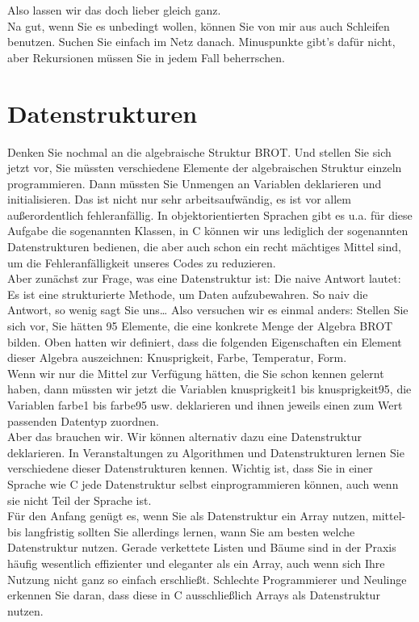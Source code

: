 Also lassen wir das doch lieber gleich ganz.\\

Na gut, wenn Sie es unbedingt wollen, können Sie von mir aus auch Schleifen benutzen. Suchen Sie einfach im Netz danach. Minuspunkte gibt’s dafür nicht, aber Rekursionen müssen Sie in jedem Fall beherrschen.

\section{Datenstrukturen}

Denken Sie nochmal an die algebraische Struktur BROT. Und stellen Sie sich jetzt vor, Sie müssten verschiedene Elemente der algebraischen Struktur einzeln programmieren. Dann müssten Sie Unmengen an Variablen deklarieren und initialisieren. Das ist nicht nur sehr arbeitsaufwändig, es ist vor allem außerordentlich fehleranfällig. In objektorientierten Sprachen gibt es u.a. für diese Aufgabe die sogenannten Klassen, in C können wir uns lediglich der sogenannten Datenstrukturen bedienen, die aber auch schon ein recht mächtiges Mittel sind, um die Fehleranfälligkeit unseres Codes zu reduzieren.\\

Aber zunächst zur Frage, was eine Datenstruktur ist: Die naive Antwort lautet: Es ist eine strukturierte Methode, um Daten aufzubewahren. So naiv die Antwort, so wenig sagt Sie uns… Also versuchen wir es einmal anders: Stellen Sie sich vor, Sie hätten 95 Elemente, die eine konkrete Menge der Algebra BROT bilden. Oben hatten wir definiert, dass die folgenden Eigenschaften ein Element dieser Algebra auszeichnen: Knusprigkeit, Farbe, Temperatur, Form.\\

Wenn wir nur die Mittel zur Verfügung hätten, die Sie schon kennen gelernt haben, dann müssten wir jetzt die Variablen knusprigkeit1 bis knusprigkeit95, die Variablen farbe1 bis farbe95 usw. deklarieren und ihnen jeweils einen zum Wert passenden Datentyp zuordnen.\\

Aber das brauchen wir. Wir können alternativ dazu eine Datenstruktur deklarieren. In Veranstaltungen zu Algorithmen und Datenstrukturen lernen Sie verschiedene dieser Datenstrukturen kennen. Wichtig ist, dass Sie in einer Sprache wie C jede Datenstruktur selbst einprogrammieren können, auch wenn sie nicht Teil der Sprache ist.\\

Für den Anfang genügt es, wenn Sie als Datenstruktur ein Array nutzen, mittel- bis langfristig sollten Sie allerdings lernen, wann Sie am besten welche Datenstruktur nutzen. Gerade verkettete Listen und Bäume sind in der Praxis häufig wesentlich effizienter und eleganter als ein Array, auch wenn sich Ihre Nutzung nicht ganz so einfach erschließt. Schlechte Programmierer und Neulinge erkennen Sie daran, dass diese in C ausschließlich Arrays als Datenstruktur nutzen.
 
